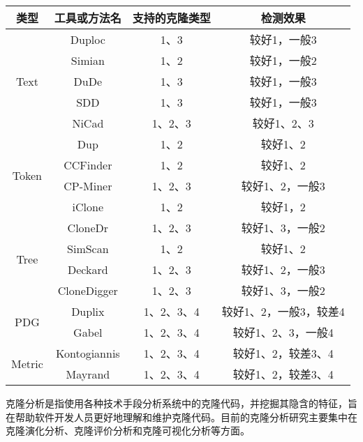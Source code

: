 \begin{table}[htbp]
\vspace{0.5em}\centering\wuhao
\begin{tabular}{cccc}
\toprule[1.5pt]
类型&工具或方法名&支持的克隆类型&检测效果\\
\midrule[1pt]
\multirow{5}{*}{Text} 
& Duploc\cite{ducasse1999language}&1、3&较好1，一般3\\
&Simian\cite{Simian}&1、2	&较好1，一般2\\
&DuDe\cite{wettel2005archeology}&1、3	&较好1，一般3\\
&SDD\cite{lee2005sdd}&1、3	&较好1，一般3\\
&NiCad\cite{roy2008nicad}&	1、2、3	&较好1、2、3\\
\midrule[1pt]
\multirow{4}{*}{Token} 
&Dup\cite{baker1995finding}&	1、2&较好1、2\\
&CCFinder\cite{kamiya2002ccfinder}&1、2&较好1、2\\
&CP-Miner\cite{li2006cp}&1、2、3&较好1、2，一般3\\
&iClone\cite{gode2009incremental}&1、2	&较好1，2\\
\midrule[1pt]
\multirow{4}{*}{Tree} 
&CloneDr\cite{baxter1998clone}&	1、2、3	&较好1、3，一般2\\
&SimScan\cite{SimScan}&	1、2	&较好1、2\\
&Deckard\cite{jiang2007deckard}&	1、2、3	&较好1、2，一般3\\
&CloneDigger\cite{bulychev2008duplicate}&	1、2、3	&较好1、3，一般2\\
\midrule[1pt]
\multirow{2}{*}{PDG} 
&Duplix\cite{krinke2001identifying}&	1、2、3、4	&较好1、2，一般3，较差4\\
&Gabel\cite{gabel2008scalable}&1、2、3、4	&较好1、2、3，一般4\\
\midrule[1pt]
\multirow{2}{*}{Metric} 
&Kontogiannis\cite{kontogiannis1996pattern}&	1、2、3、4	&较好1、2，较差3、4\\
&Mayrand\cite{mayrand1996experiment}&	1、2、3、4	&较好1、2，较差3、4\\
\bottomrule[1.5pt]
\end{tabular}
\end{table}

克隆分析是指使用各种技术手段分析系统中的克隆代码，并挖掘其隐含的特征，旨在帮助软件开发人员更好地理解和维护克隆代码。目前的克隆分析研究主要集中在克隆演化分析、克隆评价分析和克隆可视化分析等方面。

